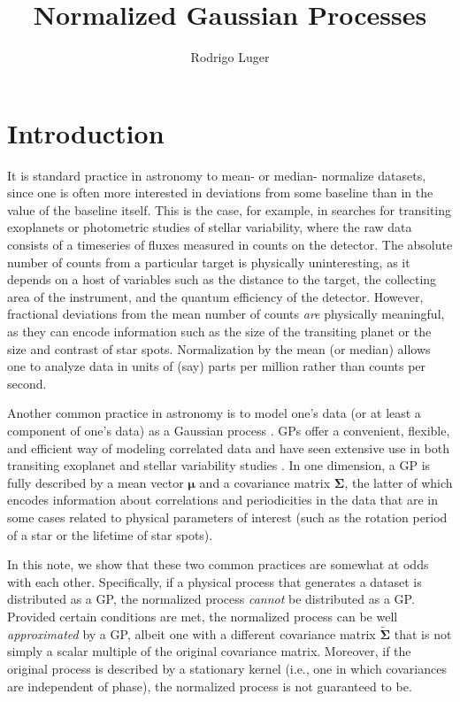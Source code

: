 \documentclass[modern]{aastex62}
\begin{document}
\title{%
    \textbf{
        Normalized Gaussian Processes
    }
}

\author{Rodrigo Luger}

\section{Introduction}

It is standard practice in astronomy to mean- or median- normalize datasets,
since one is often more interested in deviations from
some baseline than in the value of the baseline itself. This is the case,
for example, in searches for transiting exoplanets or photometric studies
of stellar variability, where the raw data
consists of a timeseries of fluxes measured in counts on the detector.
The absolute number of counts from a particular target is physically
uninteresting, as it depends on a host of variables such as the distance to
the target, the collecting area of the instrument, and the quantum efficiency of the
detector. However, fractional deviations from the mean number of counts
\emph{are} physically meaningful, as they can encode information such as the
size of the transiting planet or the size and contrast of star spots.
Normalization by the mean (or median) allows one to analyze data in units of (say)
parts per million rather than counts per second.

Another common practice in astronomy is to model one's data (or at least
a component of one's data) as a Gaussian process \citep[GP; e.g.,][]{RasmussenWilliams2005}.
GPs offer a convenient, flexible, and efficient way of modeling correlated
data and have seen extensive use in both transiting exoplanet and stellar
variability studies . In one dimension, a GP is fully described
by a mean vector $\pmb{\mu}$ and a covariance matrix $\pmb{\Sigma}$, the
latter of which encodes information about correlations and periodicities
in the data that are in some cases related to physical
parameters of interest (such as the rotation period of a star or the
lifetime of star spots).

In this note, we show that these two common practices are somewhat at odds
with each other. Specifically, if a physical process that generates
a dataset is distributed as a GP, the normalized process \emph{cannot} be
distributed as a GP. Provided certain conditions are met, the normalized
process can be well \emph{approximated} by a GP, albeit one with a different
covariance matrix $\tilde{\pmb{\Sigma}}$ that is not simply a scalar
multiple of the original covariance matrix. Moreover, if the original process
is described by a stationary kernel (i.e., one in which covariances are
independent of phase), the normalized process is not guaranteed to be.
\end{document}
